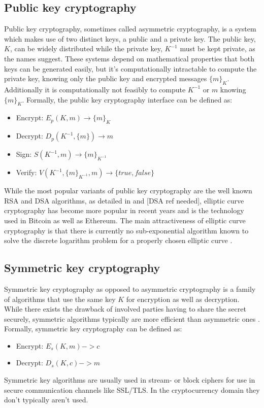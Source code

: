 \documentclass[12pt,msc,a4paper,oneside]{ucl_thesis}
\begin{document}
\subsection{Public key cryptography}
Public key cryptography, sometimes called asymmetric cryptography, is a system which makes use of two distinct keys, a public and a private key. The public key, $K$, can be widely distributed while the private key, $K^{-1}$ must be kept private, as the names suggest. These systems depend on mathematical properties that both keys can be generated easily, but it's computationally intractable to compute the private key, knowing only the public key and encrypted messages $\{m\}_K$. Additionally it is computationally not feasibly to compute $K^{-1}$ or $m$ knowing $\{m\}_K$. Formally, the public key cryptography interface can be defined as: \cite{BKarp}
\begin{itemize}
    \item{Encrypt: } $E_p(K, m) \rightarrow \{m\}_K$
    \item{Decrypt: } $D_p(K^{-1}, \{m\}) \rightarrow m$
    \item{Sign: }    $S(K^{-1}, m) \rightarrow \{m\}_{K^{-1}}$
    \item{Verify: }  $V(K^{-1}, \{m\}_{K^{-1}}, m) \rightarrow \{true, false\}$
\end{itemize}

While the most popular variants of public key cryptography are the well known RSA and DSA algorithms, as detailed in \cite{RSA:1978:MOD:359340.359342} and [DSA ref needed], elliptic curve cryptography has become more popular in recent years and is the technology used in Bitcoin as well as Ethereum. The main attractiveness of elliptic curve cryptography is that there is currently no sub-exponential algorithm known to solve the discrete logarithm problem for a properly chosen elliptic curve \cite{EllipticCurveOverview}.

\subsection{Symmetric key cryptography}
Symmetric key cryptography as opposed to asymmetric cryptography is a family of algorithms that use the same key $K$ for encryption as well as decryption. While there exists the drawback of involved parties having to share the secret securely, symmetric algorithms typically are more efficient than asymmetric ones \cite{BKarp}. Formally, symmetric key cryptography can be defined as:
\begin{itemize}
    \item{Encrypt: } $E_s(K, m) -> c$
    \item{Decrypt: } $D_s(K, c) -> m$
\end{itemize}
Symmetric key algorithms are usually used in stream- or block ciphers for use in secure communication channels like SSL/TLS. In the cryptocurrency domain they don't typically aren't used.
\end{document}
